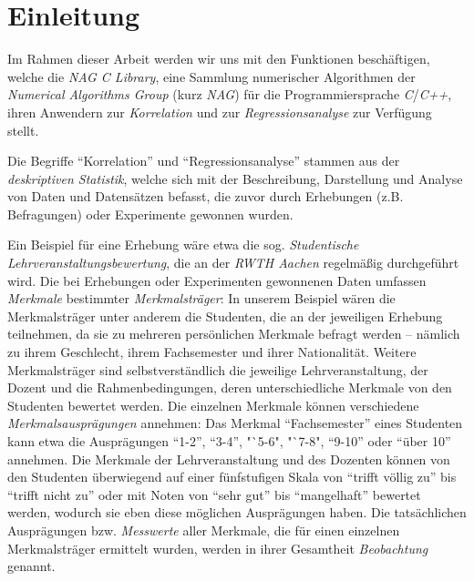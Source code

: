 \section{Einleitung}

Im Rahmen dieser Arbeit werden wir uns mit den Funktionen beschäftigen, welche die {\it NAG C Library}, eine Sammlung numerischer Algorithmen der {\it Numerical Algorithms Group} (kurz {\it NAG}) für die Programmiersprache {\it C}/{\it C++}, ihren Anwendern zur {\it Korrelation} und zur {\it Regressionsanalyse} zur Verfügung stellt.

Die Begriffe "`Korrelation"' und "`Regressionsanalyse"' stammen aus der {\it deskriptiven Statistik}, welche sich mit der Beschreibung, Darstellung und Analyse von Daten und Datensätzen befasst, die zuvor durch Erhebungen (z.B. Befragungen) oder Experimente gewonnen wurden.

Ein Beispiel für eine Erhebung wäre etwa die sog. {\it Studentische Lehrveranstaltungsbewertung}, die an der {\it RWTH Aachen} regelmäßig durchgeführt wird. Die bei Erhebungen oder Experimenten gewonnenen Daten umfassen {\it Merkmale} bestimmter {\it Merkmalsträger}: In unserem Beispiel wären die Merkmalsträger unter anderem die Studenten, die an der jeweiligen Erhebung teilnehmen, da sie zu mehreren persönlichen Merkmale befragt werden -- nämlich zu ihrem Geschlecht, ihrem Fachsemester und ihrer Nationalität. Weitere Merkmalsträger sind selbstverständlich die jeweilige Lehrveranstaltung, der Dozent und die Rahmenbedingungen, deren unterschiedliche Merkmale von den Studenten bewertet werden. Die einzelnen Merkmale können verschiedene {\it Merkmalsausprägungen} annehmen: Das Merkmal "`Fachsemester"' eines Studenten kann etwa die Ausprägungen "`1-2"', "`3-4"', "`5-6", "`7-8", "`9-10"' oder "`über 10"' annehmen. Die Merkmale der Lehrveranstaltung und des Dozenten können von den Studenten überwiegend auf einer fünfstufigen Skala von "`trifft völlig zu"' bis "`trifft nicht zu"' oder mit Noten von "`sehr gut"' bis "`mangelhaft"' bewertet werden, wodurch sie eben diese möglichen Ausprägungen haben. Die tatsächlichen Ausprägungen bzw. {\it Messwerte} aller Merkmale, die für einen einzelnen Merkmalsträger ermittelt wurden, werden in ihrer Gesamtheit {\it Beobachtung} genannt.

